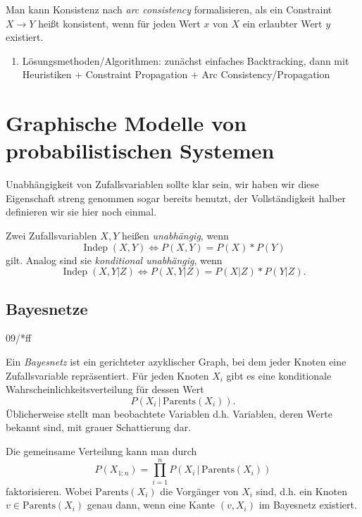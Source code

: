 \documentclass[ngerman]{../LaTeX-Templates/Paper/paper}
\newcommand{\independent}{\ensuremath{\operatorname{Indep}}}
\begin{document}
Man kann Konsistenz nach \emph{arc consistency} formalisieren, als ein Constraint $X\rightarrow Y$ heißt konsistent, wenn für jeden Wert $x$ von $X$ ein erlaubter Wert $y$ existiert.







\begin{enumerate}
	\item Lösungsmethoden/Algorithmen: zunächst einfaches Backtracking, dann mit Heuristiken + Constraint Propagation + Arc Consistency/Propagation
\end{enumerate}



\section{Graphische Modelle von probabilistischen Systemen}











Unabhängigkeit von Zufallsvariablen sollte klar sein, wir haben wir diese Eigenschaft streng genommen sogar bereits benutzt, der Vollständigkeit halber definieren wir sie hier noch einmal.
\begin{definition}[Unabhängigkeit]
	Zwei Zufallsvariablen $X,Y$ heißen \emph{unabhängig}, wenn
	\begin{equation*}
		\independent(X,Y)\Longleftrightarrow P(X,Y)=P(X)*P(Y)
	\end{equation*}
	gilt. Analog sind sie \emph{konditional unabhängig}, wenn
	\begin{equation*}
		\independent(X,Y|Z)\Longleftrightarrow P(X,Y|Z)=P(X|Z)*P(Y|Z).
	\end{equation*}
\end{definition}


\subsection{Bayesnetze}
09/*ff



\begin{definition}[Bayesnetz]
	Ein \emph{Bayesnetz} ist ein gerichteter azyklischer Graph, bei dem jeder Knoten eine Zufallsvariable repräsentiert. Für jeden Knoten $X_i$ gibt es eine konditionale Wahrscheinlichkeitsverteilung für dessen Wert
	\begin{equation*}
		P(X_i\,|\,\mathrm{Parents}(X_i)).
	\end{equation*}
	Üblicherweise stellt man beobachtete Variablen d.h. Variablen, deren Werte bekannt sind, mit grauer Schattierung dar.
\end{definition}
Die gemeinsame Verteilung kann man durch
\begin{equation*}
	P(X_{1:n})=\prod_{i=1}^nP(X_i\,|\,\mathrm{Parents}(X_i))
\end{equation*}
faktorisieren. Wobei $\mathrm{Parents}(X_i)$ die Vorgänger von $X_i$ sind, d.h. ein Knoten $v\in\mathrm{Parents}(X_i)$ genau dann, wenn eine Kante $(v,X_i)$ im Bayesnetz existiert.
\end{document}
